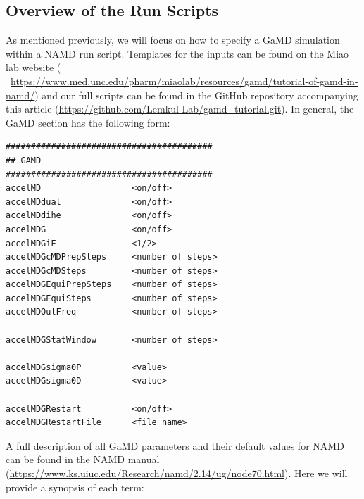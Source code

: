 \documentclass[9pt,tutorial,pubversion]{livecoms}
\newcommand{\githubrepository}{\url{https://github.com/Lemkul-Lab/gamd_tutorial.git}}  %
\begin{document}
\subsection{Overview of the Run Scripts}
As mentioned previously, we will focus on how to specify a GaMD simulation within a NAMD run script. Templates for the inputs can be found on the Miao lab website ( ~\url{https://www.med.unc.edu/pharm/miaolab/resources/gamd/tutorial-of-gamd-in-namd/}) and our full scripts can be found in the GitHub repository accompanying this article (\githubrepository). In general, the GaMD section has the following form:

\begin{lstlisting}[label=run_script,caption=Conventional and Equilibration Setup, basicstyle=\small, backgroundcolor=\color{light-gray}]
#########################################
## GAMD                    
#########################################
accelMD                  <on/off>	           
accelMDdual              <on/off>	           
accelMDdihe              <on/off>               
accelMDG                 <on/off>	           
accelMDGiE               <1/2>                               
accelMDGcMDPrepSteps     <number of steps>      
accelMDGcMDSteps         <number of steps>	   
accelMDGEquiPrepSteps    <number of steps>      
accelMDGEquiSteps        <number of steps>      
accelMDOutFreq           <number of steps>      

accelMDGStatWindow       <number of steps>	   

accelMDGsigma0P          <value>		             
accelMDGsigma0D          <value>

accelMDGRestart          <on/off> 
accelMDGRestartFile      <file name> 

\end{lstlisting}

\bigskip
A full description of all GaMD parameters and their default values for NAMD can be found in the NAMD manual (\url{https://www.ks.uiuc.edu/Research/namd/2.14/ug/node70.html}). Here we will provide a synopsis of each term:

\bigskip
\end{document}

